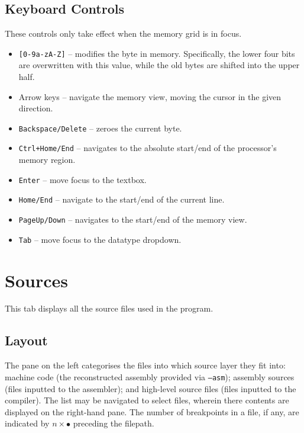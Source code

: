 \documentclass[10pt]{article}
\begin{document}
    \subsection{Keyboard Controls}

    These controls only take effect when the memory grid is in focus.

    \begin{itemize}
        \item \texttt{[0-9a-zA-Z]} -- modifies the byte in memory.
        Specifically, the lower four bits are overwritten with this value, while the old bytes are shifted into the upper half.
        \item Arrow keys -- navigate the memory view, moving the cursor in the given direction.
        \item \texttt{Backspace/Delete} -- zeroes the current byte.
        \item \texttt{Ctrl+Home/End} -- navigates to the absolute start/end of the processor's memory region.
        \item \texttt{Enter} -- move focus to the textbox.
        \item \texttt{Home/End} -- navigate to the start/end of the current line.
        \item \texttt{PageUp/Down} -- navigates to the start/end of the memory view.
        \item \texttt{Tab} -- move focus to the datatype dropdown.
    \end{itemize}

    \section{Sources}

    This tab displays all the source files used in the program.

    \subsection{Layout}

    The pane on the left categorises the files into which source layer they fit into:
    machine code (the reconstructed assembly provided via \texttt{--asm});
    assembly sources (files inputted to the assembler);
    and high-level source files (files inputted to the compiler).
    The list may be navigated to select files, wherein there contents are displayed on the right-hand pane.
    The number of breakpoints in a file, if any, are indicated by \(n \times\){\color{red}\(\bullet\)} preceding the filepath.
\end{document}
